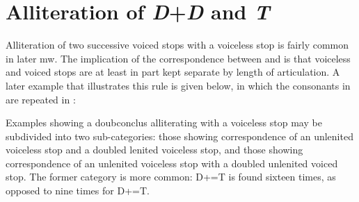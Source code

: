 \section{Alliteration of  \textit{D}+\textit{D} and \textit{T}}
\label{ddt}
Alliteration of two successive voiced stops with a voiceless stop is fairly common in later \gls{mw}. The implication of the correspondence between  and  is that voiceless and voiced stops are at least in part kept separate by length of articulation. A later example that illustrates this rule is given below, in which the consonants in  are repeated in :

Examples showing a \gls{doubconclus} alliterating with a voiceless stop may be subdivided into two sub-categories: those showing correspondence of an unlenited voiceless stop and a doubled lenited voiceless stop, and those showing correspondence of an unlenited voiceless stop with a doubled unlenited voiced stop. The former category is more common: \gls{D}+\lT=\gls{T} is found sixteen times, as opposed to nine times for \gls{D}+\xD=\gls{T}.


